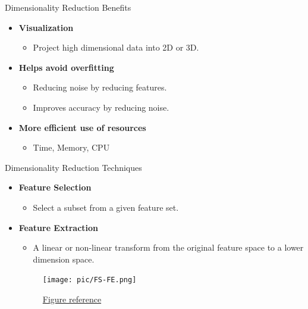 \documentclass[serif, aspectratio=169]{beamer}
\begin{document}
\begin{frame}{Dimensionality Reduction Benefits}
    \begin{itemize}
        \item \textbf{Visualization}
            \begin{itemize}
                \item Project high dimensional data into 2D or 3D.
            \end{itemize}
        \item \textbf{Helps avoid overfitting}
            \begin{itemize}
                \item Reducing noise by reducing features.
                \item Improves accuracy by reducing noise.
            \end{itemize}
        \item \textbf{More efficient use of resources}
            \begin{itemize}
                \item Time, Memory, CPU
            \end{itemize}
    \end{itemize}
\end{frame}

\begin{frame}{Dimensionality Reduction Techniques}
    \begin{itemize}
        \item \textbf{Feature Selection}
            \begin{itemize}
                \item Select a subset from a given feature set.
            \end{itemize}

         \item \textbf{Feature Extraction}
            \begin{itemize}
                \item A linear or non-linear transform from the original feature space to a lower dimension space.
            \end{itemize}
            \begin{figure}[htpb]
                \begin{center}
                    \texttt{[image: pic/FS-FE.png]}
                    \caption{\href{https://link.springer.com/article/10.1007/s00500-019-04628-6}{Figure reference}}
                \end{center}
            \end{figure}
    \end{itemize}
\end{frame}
\end{document}
